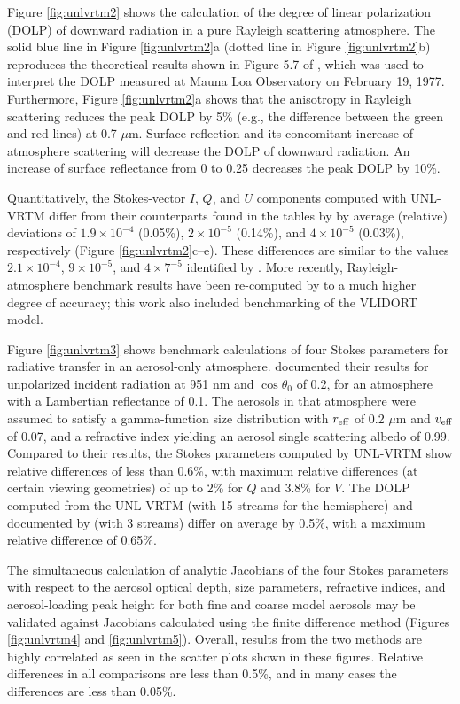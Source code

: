 Figure \ref{fig:unlvrtm2} shows the calculation of the degree of linear 
polarization (DOLP) of downward radiation in a pure Rayleigh scattering 
atmosphere. The solid blue line in Figure \ref{fig:unlvrtm2}a (dotted 
line in Figure \ref{fig:unlvrtm2}b) reproduces the theoretical results 
shown in Figure 5.7 of \citet{Coulson88}, which was used to interpret 
the DOLP measured at Mauna Loa Observatory on February 19, 1977. 
Furthermore, Figure \ref{fig:unlvrtm2}a shows that the anisotropy in
Rayleigh scattering reduces the peak DOLP by 5\% (e.g., the difference
between the green and red lines) at 0.7 $\mu$m. Surface reflection and its
concomitant increase of atmosphere scattering will decrease the DOLP of
downward radiation. An increase of surface reflectance from 0 to 0.25
decreases the peak DOLP by 10\%.

Quantitatively, the Stokes-vector $I$, $Q$, and $U$ components computed with
UNL-VRTM differ from their counterparts found in the tables by
\citet{Coulson60} by average (relative) deviations of $1.9\times 10^{-4}$
(0.05\%), $2\times 10^{-5}$ (0.14\%), and $4\times 10^{-5}$ (0.03\%), 
respectively (Figure \ref{fig:unlvrtm2}c--e). These
differences are similar to the values $2.1\times 10^{-4}$, $9\times
10^{-5}$, and $4\times 7^{-5}$ identified by \citet{Evans91}. More recently,
Rayleigh-atmosphere benchmark results have been re-computed by
\citet{Vijay12} to a much higher degree of accuracy; this work also
included benchmarking of the VLIDORT model.

Figure \ref{fig:unlvrtm3} shows benchmark calculations of four 
Stokes parameters for radiative transfer in an aerosol-only atmosphere.
\citet{Garcia89} documented their results for unpolarized incident 
radiation at 951 nm and $\cos{\theta_0}$ of 0.2, for an atmosphere with a
Lambertian reflectance of 0.1. The aerosols in that atmosphere were
assumed to satisfy a gamma-function size distribution with $r_\text{eff}$ of
0.2 $\mu$m and $v_\text{eff}$ of 0.07, and a refractive index yielding an 
aerosol single scattering albedo of 0.99. Compared to their results, 
the Stokes parameters computed by UNL-VRTM show relative differences 
of less than 0.6\%, with maximum relative differences 
(at certain viewing geometries) of up to 2\% for $Q$ and 3.8\% for $V$. 
The DOLP computed from the UNL-VRTM (with 15 streams for the hemisphere) 
and documented by \citet{Garcia89} (with 3 streams) differ on average 
by 0.5\%, with a maximum relative difference of 0.65\%.

The simultaneous calculation of analytic Jacobians of the four Stokes
parameters with respect to the aerosol optical depth, size parameters,
refractive indices, and aerosol-loading peak height for both fine and
coarse model aerosols may be validated against Jacobians calculated
using the finite difference method (Figures \ref{fig:unlvrtm4} and
\ref{fig:unlvrtm5}). Overall, results from the two methods are 
highly correlated as seen in the scatter plots
shown in these figures. Relative differences in all comparisons are
less than 0.5\%, and in many cases the differences are less than 0.05\%.

